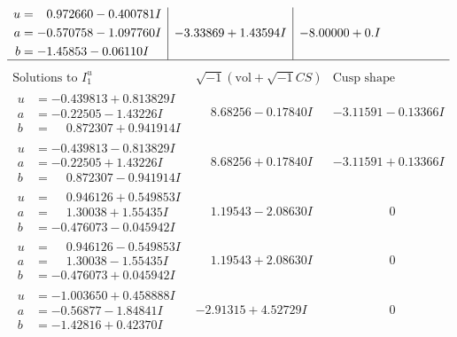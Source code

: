\documentclass[1p]{elsarticle_modified}
\theoremstyle{definition}
\newcommand{\I}{\sqrt{-1}}
\begin{document}
$$\begin{array}{c|c|c}
\begin{aligned}
u &= \phantom{-}0.972660 - 0.400781 I \\
a &= -0.570758 - 1.097760 I \\
b &= -1.45853 - 0.06110 I\end{aligned}
 & -3.33869 + 1.43594 I & -8.00000 + 0. I\phantom{ +0.000000I}\\
 \hline 
 \end{array}$$\newpage$$\begin{array}{c|c|c}  
\text{Solutions to }I^u_{1}& \I (\text{vol} + \sqrt{-1}CS) & \text{Cusp shape}\\
 \hline 
\begin{aligned}
u &= -0.439813 + 0.813829 I \\
a &= -0.22505 - 1.43226 I \\
b &= \phantom{-}0.872307 + 0.941914 I\end{aligned}
 & \phantom{-}8.68256 - 0.17840 I & -3.11591 - 0.13366 I \\ \hline\begin{aligned}
u &= -0.439813 - 0.813829 I \\
a &= -0.22505 + 1.43226 I \\
b &= \phantom{-}0.872307 - 0.941914 I\end{aligned}
 & \phantom{-}8.68256 + 0.17840 I & -3.11591 + 0.13366 I \\ \hline\begin{aligned}
u &= \phantom{-}0.946126 + 0.549853 I \\
a &= \phantom{-}1.30038 + 1.55435 I \\
b &= -0.476073 - 0.045942 I\end{aligned}
 & \phantom{-}1.19543 - 2.08630 I & \phantom{-0.000000 } 0 \\ \hline\begin{aligned}
u &= \phantom{-}0.946126 - 0.549853 I \\
a &= \phantom{-}1.30038 - 1.55435 I \\
b &= -0.476073 + 0.045942 I\end{aligned}
 & \phantom{-}1.19543 + 2.08630 I & \phantom{-0.000000 } 0 \\ \hline\begin{aligned}
u &= -1.003650 + 0.458888 I \\
a &= -0.56877 - 1.84841 I \\
b &= -1.42816 + 0.42370 I\end{aligned}
 & -2.91315 + 4.52729 I & \phantom{-0.000000 } 0 \\ \hline\begin{aligned}

\end{aligned}
\end{array}$$
\end{document}
